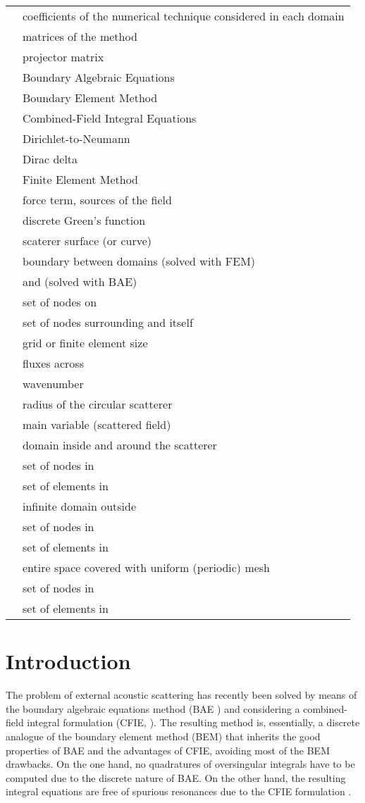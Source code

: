 \documentclass[12pt]{article}
\begin{document}
\begin{tabular}{ll}
 & coefficients of the numerical technique considered in each domain\\
 & matrices of the method \\
 & projector matrix \\
 & Boundary Algebraic Equations \\
 & Boundary Element Method \\
 & Combined-Field Integral Equations \\
 & Dirichlet-to-Neumann\\
 & Dirac delta \\
 & Finite Element Method \\
 & force term, sources of the field \\
 & discrete Green's function \\
 & scaterer surface (or curve) \\
 & boundary between domains  (solved with FEM) \\
              & and  (solved with BAE) \\
 & set of nodes on \\
 & set of nodes surrounding  and  itself\\
 & grid or finite element size \\
 & fluxes across \\
 & wavenumber \\
 & radius of the circular scatterer \\
 & main variable (scattered field) \\
 & domain inside  and around the scatterer \\
 & set of nodes in  \\
  & set of elements in  \\
 & infinite domain outside  \\
 & set of nodes in  \\
  & set of elements in  \\
 & entire space covered with uniform (periodic) mesh  \\
 & set of nodes in  \\
  & set of elements in  \\
\end{tabular}


\section{Introduction}

The problem of external acoustic scattering has recently been solved \cite{poblet-PVS:2015} by means of the boundary algebraic equations method (BAE \cite{Martinsson-Rodin:2009,Gillman-Martinsson:2010,Tsukerman:2011,Bhat-Osting:2009}) and considering a combined-field integral formulation (CFIE, \cite{Burton-Miller:1971,kirkup:1998}). The resulting method is, essentially, a discrete analogue of the boundary element method (BEM) that inherits the good properties of BAE and the advantages of CFIE, avoiding most of the BEM drawbacks. On the one hand, no quadratures of oversingular integrals have to be computed due to the discrete nature of BAE. On the other hand, the resulting integral equations are free of spurious resonances due to the CFIE formulation \cite{poblet-PVS:2014}.
\end{document}
